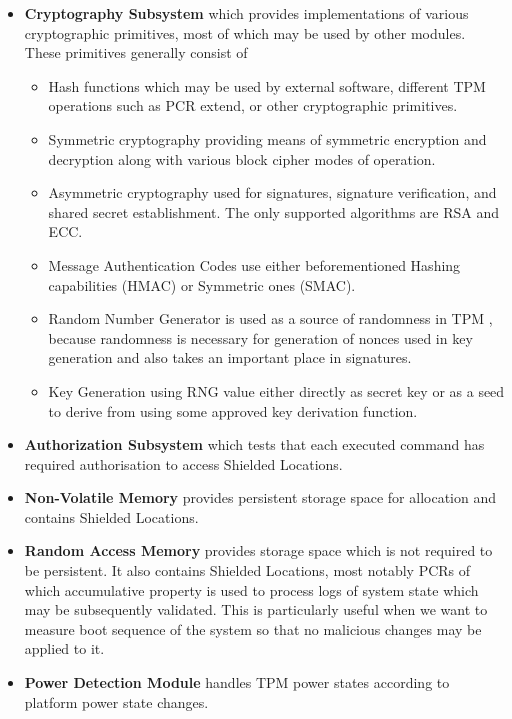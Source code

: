 \begin{itemize}

\item \textbf{Cryptography Subsystem} which provides implementations of various cryptographic primitives, most of which may be used by other modules. These primitives generally consist of 
\begin{itemize}
    \item Hash functions which may be used by external software, different TPM operations such as PCR extend, or other cryptographic primitives. 
    \item Symmetric cryptography providing means of symmetric encryption and decryption along with various block cipher modes of operation.
    \item Asymmetric cryptography used for signatures, signature verification, and shared secret establishment. The only supported algorithms are RSA and ECC.
    \item Message Authentication Codes use either beforementioned Hashing capabilities (HMAC) or Symmetric ones (SMAC).
    \item Random Number Generator is used as a source of randomness in TPM , because randomness is necessary for generation of nonces used in key generation and also takes an important place in signatures.
    \item Key Generation using RNG value either directly as secret key or as a seed to derive from using some approved key derivation function.
\end{itemize}

\item \textbf{Authorization Subsystem} which tests that each executed command has required authorisation to access Shielded Locations. 

\item \textbf{Non-Volatile Memory} provides persistent storage space for allocation and contains Shielded Locations.

\item \textbf{Random Access Memory} provides storage space which is not required to be persistent. It also contains Shielded Locations, most notably PCRs of which accumulative property is used to process logs of system state which may be subsequently validated. This is particularly useful when we want to measure boot sequence of the system so that no malicious changes may be applied to it.

\item \textbf{Power Detection Module} handles TPM power states according to platform power state changes.

\end{itemize}





